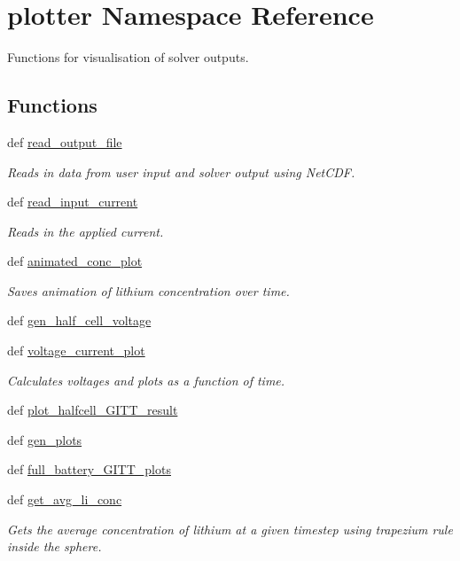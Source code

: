 \hypertarget{namespaceplotter}{\section{plotter Namespace Reference}
\label{namespaceplotter}
}


Functions for visualisation of solver outputs.  


\subsection*{Functions}
\begin{DoxyCompactItemize}
\item 
def \hyperlink{namespaceplotter_aae454e5e82b331fc3539380bf77085bb}{read\-\_\-output\-\_\-file}
\begin{DoxyCompactList}\small\item\em Reads in data from user input and solver output using Net\-C\-D\-F. \end{DoxyCompactList}\item 
def \hyperlink{namespaceplotter_ac4584f2efde622b7fe9e2b77b97b3089}{read\-\_\-input\-\_\-current}
\begin{DoxyCompactList}\small\item\em Reads in the applied current. \end{DoxyCompactList}\item 
def \hyperlink{namespaceplotter_a49b689df200e34e2e72d1e8b7122c34a}{animated\-\_\-conc\-\_\-plot}
\begin{DoxyCompactList}\small\item\em Saves animation of lithium concentration over time. \end{DoxyCompactList}\item 
def \hyperlink{namespaceplotter_a716e2d183d061a11623adaf2dba72476}{gen\-\_\-half\-\_\-cell\-\_\-voltage}
\item 
def \hyperlink{namespaceplotter_a44edad80659cbc5874617eabd87609ba}{voltage\-\_\-current\-\_\-plot}
\begin{DoxyCompactList}\small\item\em Calculates voltages and plots as a function of time. \end{DoxyCompactList}\item 
def \hyperlink{namespaceplotter_aa10bc6c7a1f0ea5ddf498ced8c1e08ee}{plot\-\_\-halfcell\-\_\-\-G\-I\-T\-T\-\_\-result}
\item 
def \hyperlink{namespaceplotter_aacce2143cb025e12026b3580467165ff}{gen\-\_\-plots}
\item 
def \hyperlink{namespaceplotter_ad575e508b7dec6d686b1ad23bd88c23e}{full\-\_\-battery\-\_\-\-G\-I\-T\-T\-\_\-plots}
\item 
def \hyperlink{namespaceplotter_a34948a1cfae887bb24a8ad480441a831}{get\-\_\-avg\-\_\-li\-\_\-conc}
\begin{DoxyCompactList}\small\item\em Gets the average concentration of lithium at a given timestep using trapezium rule inside the sphere. \end{DoxyCompactList}\end{DoxyCompactItemize}


